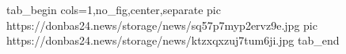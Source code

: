  
 
 
 
 

\ifcmt
  tab_begin cols=1,no_fig,center,separate
     pic https://donbas24.news/storage/news/sq57p7myp2ervz9e.jpg
     pic https://donbas24.news/storage/news/ktzxqxzuj7tum6ji.jpg
  tab_end
\fi

